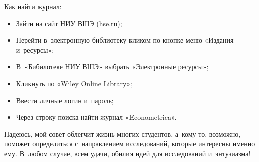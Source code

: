 \documentclass[11pt]{article}
\begin{document}
Как найти журнал:

\begin{itemize}
	\item Зайти на сайт НИУ ВШЭ (\href{http://www.hse.ru/}{hse.ru});
	\item Перейти в~электронную библиотеку кликом по кнопке меню «Издания и~ресурсы»;
	\item В~«Бибилотеке НИУ ВШЭ» выбрать «Электронные ресурсы»;
	\item Кликнуть по «Wiley Online Library»;
	\item Ввести личные логин и~пароль;
	\item Через строку поиска найти журнал «Econometrica».
\end{itemize}


Надеюсь, мой совет облегчит жизнь многих студентов, а~кому-то, возможно, поможет определиться с~направлением исследований, которые интересны именно ему. В~любом случае, всем удачи, обилия идей для исследований и~энтузиазма!
\end{document}
